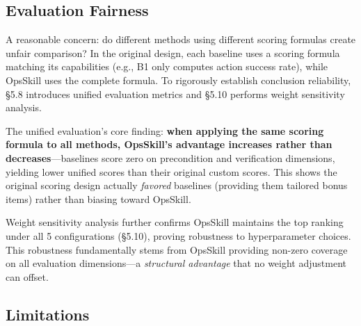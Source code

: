 \documentclass[conference,10pt]{IEEEtran}
\begin{document}
\subsection{Evaluation Fairness}

A reasonable concern: do different methods using different scoring formulas create unfair comparison?
In the original design, each baseline uses a scoring formula matching its capabilities (e.g., B1 only computes action success rate), while OpsSkill uses the complete formula.
To rigorously establish conclusion reliability, \S5.8 introduces unified evaluation metrics and \S5.10 performs weight sensitivity analysis.

The unified evaluation's core finding: \textbf{when applying the same scoring formula to all methods, OpsSkill's advantage increases rather than decreases}---baselines score zero on precondition and verification dimensions, yielding lower unified scores than their original custom scores.
This shows the original scoring design actually \emph{favored} baselines (providing them tailored bonus items) rather than biasing toward OpsSkill.

Weight sensitivity analysis further confirms OpsSkill maintains the top ranking under all 5 configurations (\S5.10), proving robustness to hyperparameter choices.
This robustness fundamentally stems from OpsSkill providing non-zero coverage on all evaluation dimensions---a \emph{structural advantage} that no weight adjustment can offset.

\subsection{Limitations}
\end{document}
